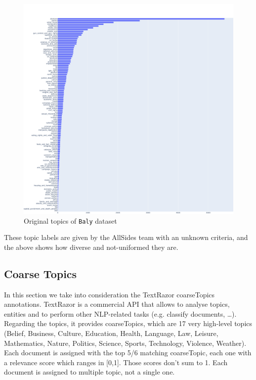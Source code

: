 \begin{figure}[!htbp]
    \centering
    \includegraphics[width=\linewidth]{figures/baly_original_topics.pdf}
    \caption{Original topics of \texttt{Baly} dataset}
    \label{fig:baly_original_topics}
\end{figure}

These topic labels are given by the AllSides team with an unknown criteria, and the above shows how diverse and not-uniformed they are.


\subsection{Coarse Topics}

In this section we take into consideration the TextRazor coarseTopics annotations. TextRazor is a commercial API that allows to analyse topics, entities and to perform other NLP-related tasks (e.g. classify documents, …).
Regarding the topics, it provides coarseTopics, which are 17 very high-level topics (Belief, Business, Culture, Education, Health, Language, Law, Leisure, Mathematics, Nature, Politics, Science, Sports, Technology, Violence, Weather).
Each document is assigned with the top 5/6 matching coarseTopic, each one with a relevance score which ranges in [0,1]. Those scores don’t sum to 1. Each document is assigned to multiple topic, not a single one.

